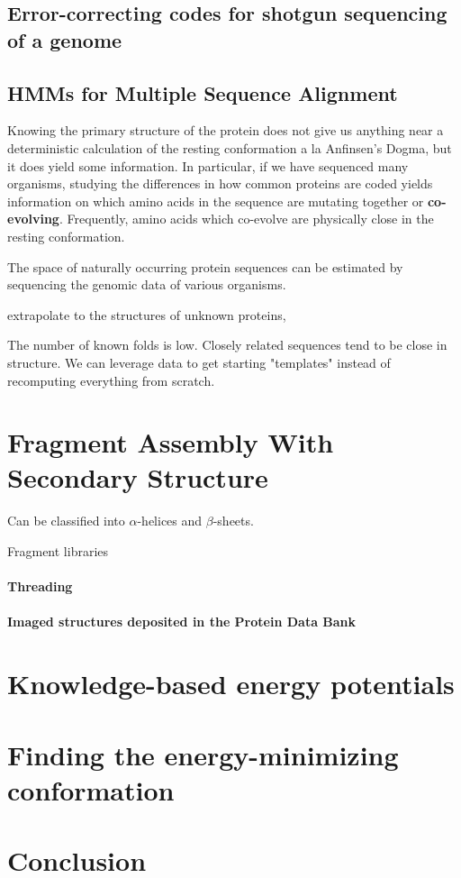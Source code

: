 \documentclass{article}
\begin{document}
\subsection{Error-correcting codes for shotgun sequencing of a genome}


\subsection{HMMs for Multiple Sequence Alignment}
Knowing the primary structure of the protein does not give us anything near a deterministic calculation of the resting conformation a la Anfinsen's Dogma, but it does yield some information. In particular, if we have sequenced many organisms, studying the differences in how common proteins are coded yields information on which amino acids in the sequence are mutating together or \textbf{co-evolving}. Frequently, amino acids which co-evolve are physically close in the resting conformation. 


The space of naturally occurring protein sequences can be estimated by sequencing the genomic data of various organisms. 

extrapolate to the structures of unknown proteins, 

The number of known folds is low. Closely related sequences tend to be close in structure. We can leverage data to get starting "templates" instead of recomputing everything from scratch.


\section{Fragment Assembly With Secondary Structure}
Can be classified into $\alpha$-helices and $\beta$-sheets.

Fragment libraries

\paragraph{Threading}

\paragraph{Imaged structures deposited in the Protein Data Bank}

\section{Knowledge-based energy potentials}

\section{Finding the energy-minimizing conformation}

\section{Conclusion}

\printbibliography
\end{document}
